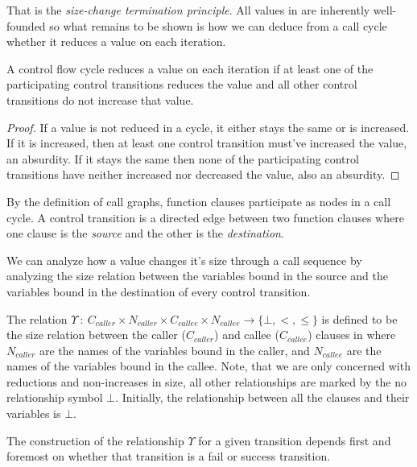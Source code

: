 That is the \emph{size-change termination principle}. All values in \D{} are
inherently well-founded so what remains to be shown is how we can deduce from a
call cycle whether it reduces a value on each iteration.

\begin{lemma}\label{lemma:cycle-reduce} A control flow cycle reduces a value on
each iteration if at least one of the participating control transitions reduces
the value and all other control transitions do not increase that
value.\end{lemma}

\begin{proof} If a value is not reduced in a cycle, it either stays the same or
is increased. If it is increased, then at least one control transition must've
increased the value, an absurdity. If it stays the same then none of the
participating control transitions have neither increased nor decreased the
value, also an absurdity. \end{proof}

By the definition of call graphs, function clauses participate as nodes in a
call cycle. A control transition is a directed edge between two function
clauses where one clause is the \emph{source} and the other is the
\emph{destination}. 

We can analyze how a value changes it's size through a call sequence by
analyzing the size relation between the variables bound in the source and the
variables bound in the destination of every control transition.


\begin{definition} The relation $\Upsilon\ :\ C_{caller} \times N_{caller}
\times C_{callee} \times N_{callee} \rightarrow \{\bot,<,\leq\}$ is defined to
be the size relation between the caller ($C_{caller}$) and callee
($C_{callee}$) clauses in \D{} where $N_{caller}$ are the names of the
variables bound in the caller, and $N_{callee}$ are the names of the variables
bound in the callee. Note, that we are only concerned with reductions and
non-increases in size, all other relationships are marked by the no
relationship symbol $\bot$. Initially, the relationship between all the clauses
and their variables is $\bot$. \end{definition}

The construction of the relationship $\Upsilon$ for a given transition depends
first and foremost on whether that transition is a fail or success transition.

